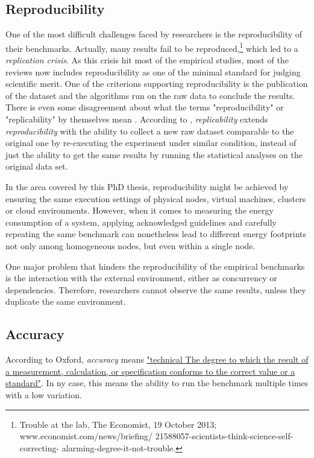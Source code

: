 \subsection{Reproducibility}
One of the most difficult challenges faced by researchers is the reproducibility of their benchmarks.
Actually, many results fail to be reproduced,\footnote{Trouble at the lab, The Economist, 19 October 2013;  www.economist.com/news/briefing/ 21588057-scientists-think-science-self-correcting- alarming-degree-it-not-trouble.} which led to a \emph{replication crisis}.
As this crisis hit most of the empirical studies, most of the reviews now includes reproducibility as one of the minimal standard for judging scientific merit.\cite{peng2011reproducible}
One of the criterions supporting reproducibility is the publication of the dataset and the algorithms run on the raw data to conclude the results.
There is even some disagreement about what the terms "reproducibility" or "replicability" by themselves mean \cite{goodman2016does}.
According to \cite{echtler2018open}, \emph{replicability} extends \emph{reproducibility} with the ability to collect a new raw dataset comparable to the original one by re-executing the experiment under similar condition, instead of just the ability to get the same results by running the statistical analyses on the original data set.

In the area covered by this PhD thesis, reproducibility might be achieved by ensuring the same execution settings of physical nodes, virtual machines, clusters or cloud environments.
However, when it comes to measuring the energy consumption of a system, applying acknowledged guidelines and carefully repeating the same benchmark can nonetheless lead to different energy footprints not only among homogeneous nodes, but even within a single node.

One major problem that hinders the reproducibility of the empirical benchmarks is the interaction with the external environment, either as concurrency or dependencies.
Therefore, researchers cannot observe the same results, unless they duplicate the same environment.


\subsection{Accuracy}
According to Oxford, \emph{accuracy} means \href{https://www.lexico.com/definition/accuracy}{"technical The degree to which the result of a measurement, calculation, or specification conforms to the correct value or a standard"}.
In ny case, this means the ability to run the benchmark multiple times with a low variation.

